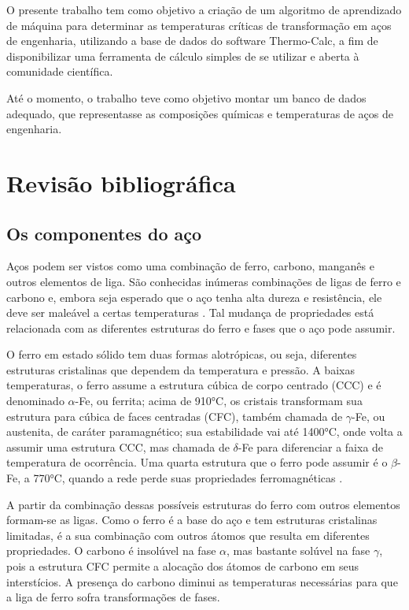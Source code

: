 \documentclass[brazil,tese,epusp]{usp}
\begin{document}
O presente trabalho tem como objetivo a criação de um algoritmo de aprendizado de máquina para determinar as temperaturas críticas de transformação em aços de engenharia, utilizando a base de dados do software Thermo-Calc\textregistered{}, a fim de disponibilizar uma ferramenta de cálculo simples de se utilizar e aberta à comunidade científica.

Até o momento, o trabalho teve como objetivo montar um banco de dados adequado, que representasse as composições químicas e temperaturas de aços de engenharia.

\chapter{Revisão bibliográfica}

\section{Os componentes do aço}

Aços podem ser vistos como uma combinação de ferro, carbono, manganês e outros elementos de liga. São conhecidas inúmeras combinações de ligas de ferro e carbono e, embora seja esperado que o aço tenha alta dureza e resistência, ele deve ser maleável a certas temperaturas \cite{Dossett2006}. Tal mudança de propriedades está relacionada com as diferentes estruturas do ferro e fases que o aço pode assumir.

O ferro em estado sólido tem duas formas alotrópicas, ou seja, diferentes estruturas cristalinas que dependem da temperatura e pressão. A baixas temperaturas, o ferro assume a estrutura cúbica de corpo centrado (CCC) e é denominado $\alpha$-Fe, ou ferrita; acima de 910°C, os cristais transformam sua estrutura para cúbica de faces centradas (CFC), também chamada de $\gamma$-Fe, ou austenita, de caráter paramagnético; sua estabilidade vai até 1400°C, onde volta a assumir uma estrutura CCC, mas chamada de $\delta$-Fe para diferenciar a faixa de temperatura de ocorrência.  Uma quarta estrutura que o ferro pode assumir é o $\beta$-Fe, a 770°C, quando a rede perde suas propriedades ferromagnéticas \cite{Totten2006}.

A partir da combinação dessas possíveis estruturas do ferro com outros elementos formam-se as ligas. Como o ferro é a base do aço e tem estruturas cristalinas limitadas, é a sua combinação com outros átomos que resulta em diferentes propriedades. O carbono é insolúvel na fase $\alpha$, mas bastante solúvel na fase $\gamma$, pois a estrutura CFC permite a alocação dos átomos de carbono em seus interstícios. A presença do carbono diminui as temperaturas necessárias para que a liga de ferro sofra transformações de fases.
\end{document}
